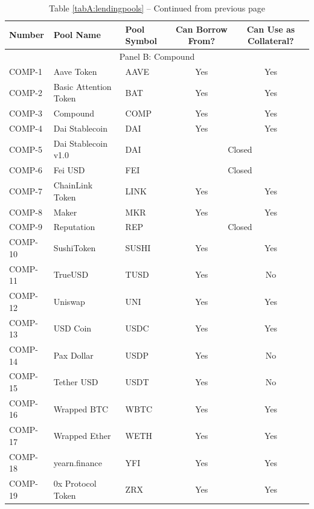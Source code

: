 \begin{table}[ht!]
\small
\centering
\caption*{Table \ref*{tabA:lendingpools} -- Continued from previous page}

\begin{tabular*}{\linewidth}{@{\extracolsep{\fill}}lllcc}
    \toprule
    Number & Pool Name & Pool Symbol & Can Borrow From? & Can Use as Collateral? \\
    \midrule
    \multicolumn{5}{c}{Panel B: Compound} \\
    \midrule
    COMP-1 & Aave Token & AAVE  & Yes   & Yes \\
    COMP-2 & Basic Attention Token & BAT   & Yes   & Yes \\
    COMP-3 & Compound & COMP  & Yes   & Yes \\
    COMP-4 & Dai Stablecoin & DAI   & Yes   & Yes \\
    COMP-5 & Dai Stablecoin v1.0 & DAI   & \multicolumn{2}{c}{Closed} \\
    COMP-6 & Fei USD & FEI   & \multicolumn{2}{c}{Closed} \\
    COMP-7 & ChainLink Token & LINK  & Yes   & Yes \\
    COMP-8 & Maker & MKR   & Yes   & Yes \\
    COMP-9 & Reputation & REP   & \multicolumn{2}{c}{Closed} \\
    COMP-10 & SushiToken & SUSHI & Yes   & Yes \\
    COMP-11 & TrueUSD & TUSD  & Yes   & No \\
    COMP-12 & Uniswap & UNI   & Yes   & Yes \\
    COMP-13 & USD Coin & USDC  & Yes   & Yes \\
    COMP-14 & Pax Dollar & USDP  & Yes   & No \\
    COMP-15 & Tether USD & USDT  & Yes   & No \\
    COMP-16 & Wrapped BTC & WBTC  & Yes   & Yes \\
    COMP-17 & Wrapped Ether & WETH  & Yes   & Yes \\
    COMP-18 & yearn.finance & YFI   & Yes   & Yes \\
    COMP-19 & 0x Protocol Token & ZRX   & Yes   & Yes \\
    \bottomrule
          \end{tabular*} 
 

\end{table}

\clearpage
\newpage
    

